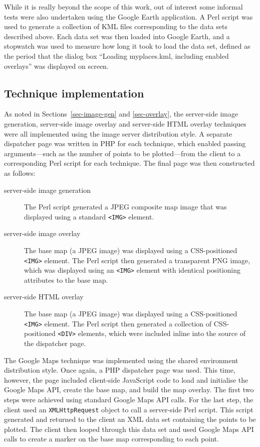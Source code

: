\documentclass[acmtocl,acmnow]{acmtrans2m}
\begin{document}
While it is really beyond the scope of this work, out of interest some
informal tests were also undertaken using the Google Earth application.
A Perl script was used to generate a collection of KML files
corresponding to the data sets described above. Each data set was then
loaded into Google Earth, and a stopwatch was used to measure how long
it took to load the data set, defined as the period that the dialog box
``Loading myplaces.kml, including enabled overlays'' was displayed on
screen.


\subsection{Technique implementation}

As noted in Sections~\ref{sec-image-gen} and \ref{sec-overlay}, the
server-side image generation, server-side image overlay and server-side
HTML overlay techniques were all implemented using the image server
distribution style. A separate dispatcher page was written in PHP for
each technique, which enabled passing arguments---such as the number of
points to be plotted---from the client to a corresponding Perl script
for each technique. The final page was then constructed as follows:
\begin{description}

	\item[server-side image generation] The Perl script generated a JPEG
	composite map image that was displayed using a standard \verb|<IMG>|
	element.

	\item[server-side image overlay] The base map (a JPEG image) was
	displayed using a CSS-positioned \verb|<IMG>| element. The Perl
	script then generated a transparent PNG image, which was displayed
	using an \verb|<IMG>| element with identical positioning attributes
	to the base map.

	\item[server-side HTML overlay] The base map (a JPEG image) was
	displayed using a CSS-positioned \verb|<IMG>| element. The Perl
	script then generated a collection of CSS-positioned \verb|<DIV>|
	elements, which were included inline into the source of the
	dispatcher page.

\end{description}

The Google Maps technique was implemented using the shared environment
distribution style. Once again, a PHP dispatcher page was used. This
time, however, the page included client-side JavaScript code to load and
initialise the Google Maps API, create the base map, and build the map
overlay. The first two steps were achieved using standard Google Maps
API calls. For the last step, the client used an \texttt{XMLHttpRequest}
object to call a server-side Perl script. This script generated and
returned to the client an XML data set containing the points to be
plotted. The client then looped through this data set and used Google
Maps API calls to create a marker on the base map corresponding to each
point.
\end{document}
